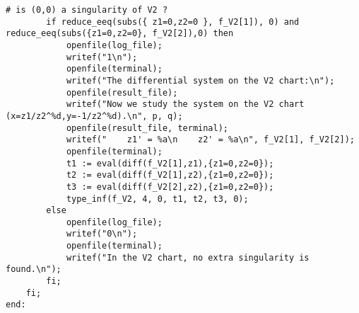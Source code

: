 \documentclass[a4paper,10pt]{article}
\begin{document}
\begin{lstlisting}[name=infinity]
        # is (0,0) a singularity of V2 ?
        if reduce_eeq(subs({ z1=0,z2=0 }, f_V2[1]), 0) and reduce_eeq(subs({z1=0,z2=0}, f_V2[2]),0) then
            openfile(log_file);
            writef("1\n");
            openfile(terminal);
            writef("The differential system on the V2 chart:\n");
            openfile(result_file);
            writef("Now we study the system on the V2 chart (x=z1/z2^%d,y=-1/z2^%d).\n", p, q);
            openfile(result_file, terminal);
            writef("    z1' = %a\n    z2' = %a\n", f_V2[1], f_V2[2]);
            openfile(terminal);
            t1 := eval(diff(f_V2[1],z1),{z1=0,z2=0});
            t2 := eval(diff(f_V2[1],z2),{z1=0,z2=0});
            t3 := eval(diff(f_V2[2],z2),{z1=0,z2=0});
            type_inf(f_V2, 4, 0, t1, t2, t3, 0);
        else
            openfile(log_file);
            writef("0\n");
            openfile(terminal);
            writef("In the V2 chart, no extra singularity is found.\n");
        fi;
    fi;
end:
\end{lstlisting}
\end{document}
